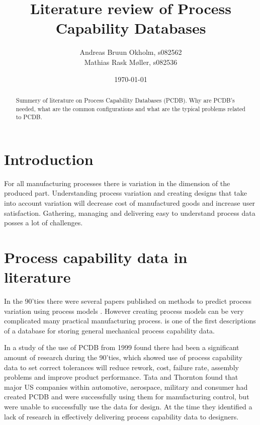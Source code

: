 \documentclass[aip,amsmath,reprint, author-year]{revtex4-1}
\begin{document}
\begin{abstract}
Summery of literature on Process Capability Databases (PCDB). Why are PCDB's needed, what are the common configurations and what are the typical problems related to PCDB.
\end{abstract}

\title{Literature review of Process Capability Databases}
\author{Andreas Bruun Okholm, s082562\\
Mathias Rask Møller, s082536 }
 
\date{\today}
\maketitle


\section{Introduction}
For all manufacturing processes there is variation in the dimension of the produced part.
Understanding process variation and creating designs that take into account variation will decrease cost of manufactured goods and increase user satisfaction. Gathering, managing and delivering easy to understand process data posses a lot of challenges.  


\section{Process capability data in literature}
In the 90'ties there were several papers published on methods to predict process variation using process models \cite{thornton2000use}. However creating process models can be very complicated many practical manufacturing process. 
\cite{perzyk1998selection} is one of the first descriptions of a database for storing general  mechanical process capability data.

In a study of the use of PCDB from 1999 \citet{tata1999process} found there had been a significant amount of research during the 90'ties, which showed use of process capability data to set correct tolerances will reduce rework, cost, failure rate, assembly problems and improve product performance. 
Tata and Thornton found that major US companies within automotive, aerospace, military and consumer had created PCDB and were successfully using them for manufacturing control, but were unable to successfully use the data for design.   
At the time they identified a lack of research in effectively delivering process capability data to designers. 
\end{document}
